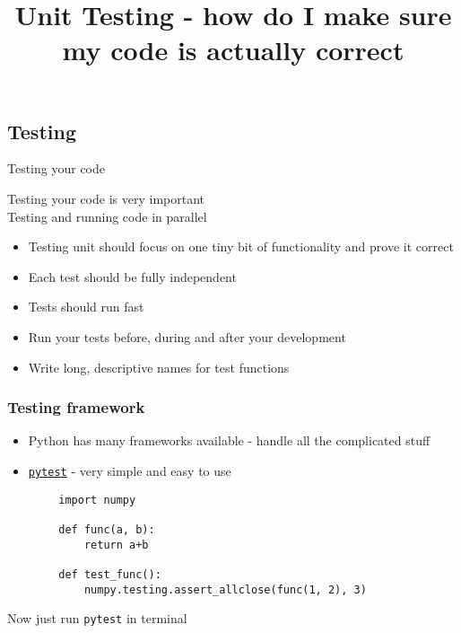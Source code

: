 \documentclass[11pt,professionalfonts]{beamer}
\title[Unit Testing]{\large \textbf{Unit Testing - how do I make sure my code is actually correct}}
\author{\vspace*{-0.3cm}}
\institute{
  \footnotesize
  {\normalsize\bf{Shankar Kulumani}}\\
  \vspace*{0.2cm}
    \textbf{Flight Dynamics \& Control Lab}\\ \vspace*{0.5cm}
  \begin{figure} %
        \texttt{[image: figures/gw\_txh\_2cs\_pos.pdf]}
    \end{figure}
}
\date{}
\begin{document}

\setcounter{framenumber}{-1}
\begin{frame} %
  \titlepage
\end{frame}   %

\section*{}
\subsection*{Testing}  
\begin{frame}{Testing your code}
    \begin{alertblock}{}
        \centering 
        Testing your code is very important \\
        Testing and running code in parallel
    \end{alertblock}
    \pause
    \begin{itemize}
        \item Testing unit should focus on one tiny bit of functionality and prove it correct
        \item Each test should be fully independent
        \item Tests should run fast
        \item Run your tests before, during and after your development
        \item Write long, descriptive names for test functions
    \end{itemize}
\end{frame}

\begin{frame}[fragile]\frametitle{Testing framework}
    \begin{itemize}
        \item Python has many frameworks available - handle all the complicated stuff
        \item \texttt{\href{https://docs.pytest.org/en/latest/}{pytest}} - very simple and easy to use
    \end{itemize}
    \begin{verbatim}
        import numpy

        def func(a, b):
            return a+b

        def test_func():
            numpy.testing.assert_allclose(func(1, 2), 3)

    \end{verbatim}
    \pause
    \begin{alertblock}{}
        Now just run \texttt{pytest} in terminal
    \end{alertblock}
\end{frame}
\end{document}
